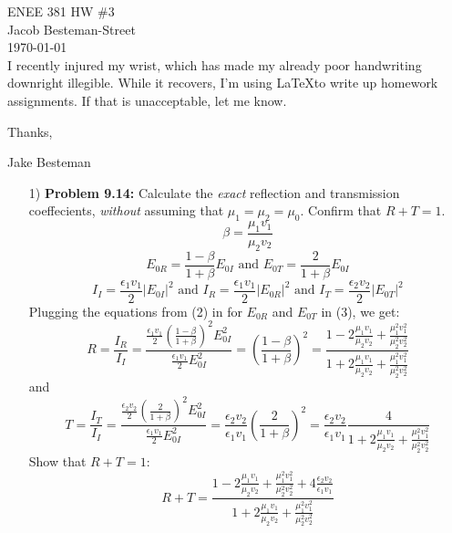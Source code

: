 \documentclass{report}
\begin{document}
ENEE 381 HW \#3 \\
Jacob Besteman-Street \\
\today \\
I recently injured my wrist, which has made my already poor handwriting downright illegible.
While it recovers, I'm using \LaTeX to write up homework assignments. If that is unacceptable, let me know.

Thanks,

Jake Besteman

\begin{itemize}
  \item[1)] \textbf{Problem 9.14:} Calculate the \textit{exact} reflection and transmission coeffecients, \textit{without}
  assuming that $\mu_1 = \mu_2 = \mu_0$. Confirm that $R+T=1$. \\
  \newline
  \begin{equation}
    \label{beta}
    \beta = \frac{\mu_1v_1}{\mu_2v_2}
  \end{equation}
  \begin{equation}
    E_{0R}= \frac{1-\beta}{1+\beta}E_{0I} \text{ and } E_{0T}= \frac{2}{1+\beta}E_{0I}
  \end{equation}
  \begin{equation}
  I_I = \frac{\epsilon_1v_1}{2}|E_{0I}|^2 \text{ and }I_R = \frac{\epsilon_1v_1}{2}|E_{0R}|^2\text{ and }I_T = \frac{\epsilon_2v_2}{2}|E_{0T}|^2
  \end{equation}
Plugging the equations from (2) in for $E_{0R}$ and $E_{0T}$ in (3), we get:
\begin{equation}
R = \frac{I_R}{I_I}  = \frac{\frac{\epsilon_1v_1}{2}(\frac{1-\beta}{1+\beta})^2E_{0I}^2}{\frac{\epsilon_1v_1}{2}E_{0I}^2} = (\frac{1-\beta}{1+\beta})^2 = \frac{1-2\frac{\mu_1v_1}{\mu_2v_2}+\frac{\mu_1^2v_1^2}{\mu_2^2v_2^2}}{1+2\frac{\mu_1v_1}{\mu_2v_2}+\frac{\mu_1^2v_1^2}{\mu_2^2v_2^2}}
\end{equation}
and
\begin{equation}
T = \frac{I_T}{I_I}  = \frac{\frac{\epsilon_2v_2}{2}(\frac{2}{1+\beta})^2E_{0I}^2}{\frac{\epsilon_1v_1}{2}E_{0I}^2} = \frac{\epsilon_2v_2}{\epsilon_1v_1}(\frac{2}{1+\beta})^2 =\frac{\epsilon_2v_2}{\epsilon_1v_1} \frac{4}{1+2\frac{\mu_1v_1}{\mu_2v_2}+\frac{\mu_1^2v_1^2}{\mu_2^2v_2^2}}
\end{equation}
Show that $R+T=1$:
\begin{equation}
  R+T=\frac{1-2\frac{\mu_1v_1}{\mu_2v_2}+\frac{\mu_1^2v_1^2}{\mu_2^2v_2^2}+4\frac{\epsilon_2v_2}{\epsilon_1v_1}}{1+2\frac{\mu_1v_1}{\mu_2v_2}+\frac{\mu_1^2v_1^2}{\mu_2^2v_2^2}}

\end{equation}
\end{itemize}
\end{document}
